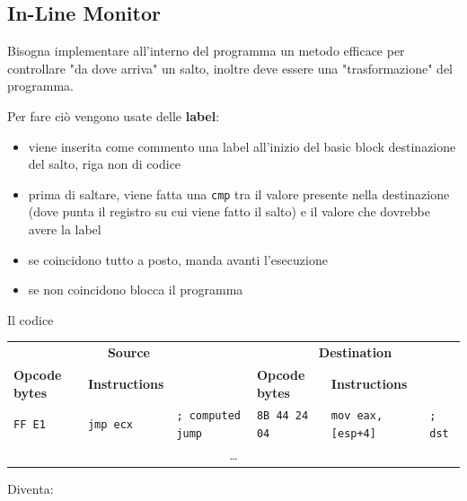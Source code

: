\subsection{In-Line Monitor}

Bisogna implementare all'interno del programma un metodo efficace per controllare "da dove arriva" un salto, inoltre deve essere una "trasformazione" del programma. 

Per fare ciò vengono usate delle \textbf{label}:
\begin{itemize}
	\item viene inserita come commento una label all'inizio del basic block destinazione del salto, riga non di codice

	\item prima di saltare, viene fatta una \texttt{cmp} tra il valore presente nella destinazione (dove punta il registro su cui viene fatto il salto) e il valore che dovrebbe avere la label

	\item se coincidono tutto a posto, manda avanti l'esecuzione

	\item se non coincidono blocca il programma
\end{itemize}

\newpage %

Il codice
\begin{table}[h!]
	\centering
	\begin{adjustbox}{max width=\textwidth}
	\begin{tabular}{@{} lll | lll @{}}
		\multicolumn{3}{c}{\bfseries Source} & \multicolumn{3}{c}{\bfseries Destination} \\
		\cmidrule(lr){1-3} \cmidrule(l){4-6}
		\bfseries Opcode bytes & \bfseries Instructions &
		& \bfseries Opcode bytes & \bfseries Instructions & \\
		\midrule
		\texttt{FF E1} & \texttt{jmp ecx} & \texttt{; computed jump}
		& \texttt{8B 44 24 04} & \texttt{mov eax, [esp+4]} & \texttt{; dst} \\
		\multicolumn{6}{c}{\dots} \\
	\end{tabular}
	\end{adjustbox}
\end{table}

Diventa:

